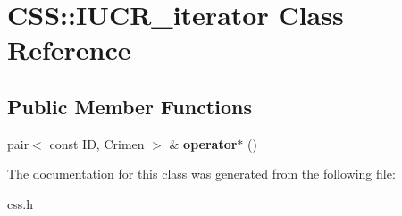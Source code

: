 \hypertarget{classCSS_1_1IUCR__iterator}{}\section{C\+S\+S\+:\+:I\+U\+C\+R\+\_\+iterator Class Reference}
\label{classCSS_1_1IUCR__iterator}
\subsection*{Public Member Functions}
\begin{DoxyCompactItemize}
\item 
\hypertarget{classCSS_1_1IUCR__iterator_a3456bf38277349366ea92704b1f0baae}{}pair$<$ const I\+D, Crimen $>$ \& {\bfseries operator$\ast$} ()\label{classCSS_1_1IUCR__iterator_a3456bf38277349366ea92704b1f0baae}

\end{DoxyCompactItemize}


The documentation for this class was generated from the following file\+:\begin{DoxyCompactItemize}
\item 
css.\+h\end{DoxyCompactItemize}
